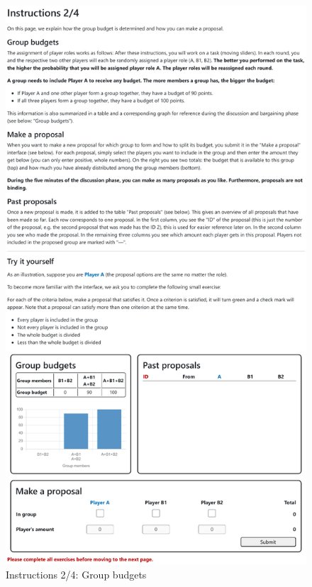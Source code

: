 \documentclass[12pt]{article}
\begin{document}
\begin{figure}[!htb]
    \centering
    \includegraphics[width=.7\linewidth]{screenshots/instructions_2.pdf}
    \caption{Instructions 2/4: Group budgets}
\end{figure}
\end{document}
